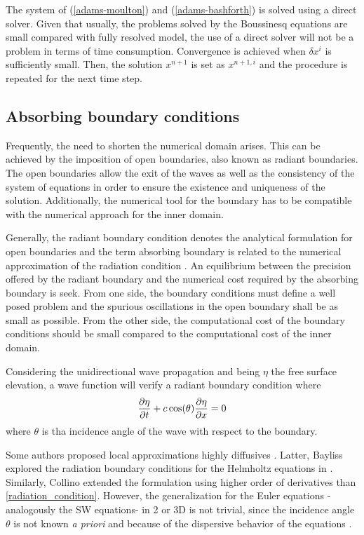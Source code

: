 The system of (\ref{adams-moulton}) and (\ref{adams-bashforth}) is solved using a direct solver. Given that usually, the problems solved by the Boussinesq equations are small compared with fully resolved model, the use of a direct solver will not be a problem in terms of time consumption.
Convergence is achieved when $\delta x^i$ is sufficiently small. Then, the solution $x^{n+1}$ is set as $x^{n+1,i}$ and the procedure is repeated for the next time step.





\subsection{Absorbing boundary conditions}
\label{eulerian_bsq_absorbing}


Frequently, the need to shorten the numerical domain arises. This can be achieved by the imposition of open boundaries, also known as radiant boundaries. The open boundaries allow the exit of the waves as well as the consistency of the system of equations in order to ensure the existence and uniqueness of the solution. Additionally, the numerical tool for the boundary has to be compatible with the numerical approach for the inner domain.

Generally, the radiant boundary condition denotes the analytical formulation for open boundaries and the term absorbing boundary is related to the numerical approximation of the radiation condition \cite{navon2004}. An equilibrium between the precision offered by the radiant boundary and the numerical cost required by the absorbing boundary is seek.
From one side, the boundary conditions must define a well posed problem and the spurious oscillations in the open boundary shall be as small as possible. From the other side, the computational cost of the boundary conditions should be small compared to the computational cost of the inner domain.

Considering the unidirectional wave propagation and being $\eta$ the free surface elevation, a wave function will verify a radiant boundary condition where
\begin{equation} \label{radiation_condition}
    \frac{\partial\eta}{\partial t} + c \cos(\theta)\frac{\partial\eta}{\partial x} = 0
\end{equation}
where $\theta$ is tha incidence angle of the wave with respect to the boundary.

Some authors proposed local approximations highly diffusives \cite{engquist1977}. Latter, Bayliss explored the radiation boundary conditions for the Helmholtz equations in \cite{bayliss1982}.
Similarly, Collino \cite{collino1993} extended the formulation using higher order of derivatives than \ref{radiation_condition}. However, the generalization for the Euler equations -analogously the SW equations- in 2 or 3D is not trivial, since the incidence angle $\theta$ is not known \emph{a priori} and because of the dispersive behavior of the equations \cite{wei1995}.

